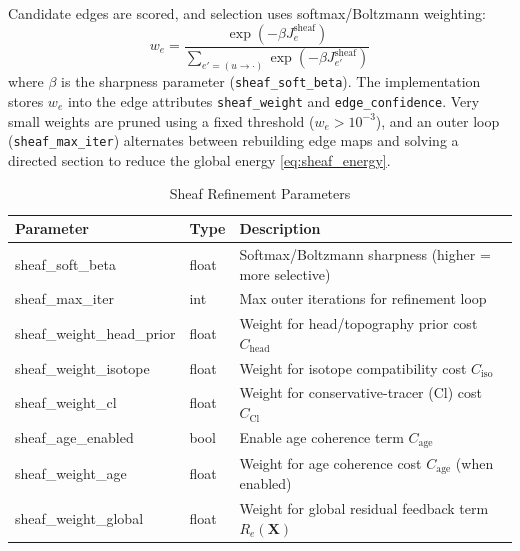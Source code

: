 \documentclass[12pt,a4paper]{article}
\theoremstyle{plain}
\theoremstyle{definition}
\theoremstyle{remark}
\begin{document}
Candidate edges are scored, and selection uses softmax/Boltzmann weighting:
\begin{equation}
w_e = \frac{\exp(-\beta J^{\text{sheaf}}_e)}{\sum\limits_{e'=(u\to \cdot)} \exp(-\beta J^{\text{sheaf}}_{e'})}
\end{equation}
where $\beta$ is the sharpness parameter (\texttt{sheaf\_soft\_beta}). The implementation stores $w_e$ into the edge attributes \texttt{sheaf\_weight} and \texttt{edge\_confidence}. Very small weights are pruned using a fixed threshold ($w_e > 10^{-3}$), and an outer loop (\texttt{sheaf\_max\_iter}) alternates between rebuilding edge maps and solving a directed section to reduce the global energy \eqref{eq:sheaf_energy}.

\begin{table}[htbp]
\caption{Sheaf Refinement Parameters}
\label{tab:sheaf_refine_params}
\begin{tabularx}{\textwidth}{@{} l l X @{}}
\toprule
Parameter & Type & Description \\
\midrule
sheaf\_soft\_beta & float & Softmax/Boltzmann sharpness (higher = more selective) \\
sheaf\_max\_iter & int & Max outer iterations for refinement loop \\
sheaf\_weight\_head\_prior & float & Weight for head/topography prior cost $C_{\mathrm{head}}$ \\
sheaf\_weight\_isotope & float & Weight for isotope compatibility cost $C_{\mathrm{iso}}$ \\
sheaf\_weight\_cl & float & Weight for conservative-tracer (Cl) cost $C_{\mathrm{Cl}}$ \\
sheaf\_age\_enabled & bool & Enable age coherence term $C_{\mathrm{age}}$ \\
sheaf\_weight\_age & float & Weight for age coherence cost $C_{\mathrm{age}}$ (when enabled) \\
sheaf\_weight\_global & float & Weight for global residual feedback term $R_e(\mathbf{X})$ \\
\bottomrule
\end{tabularx}
\end{table}
\end{document}
